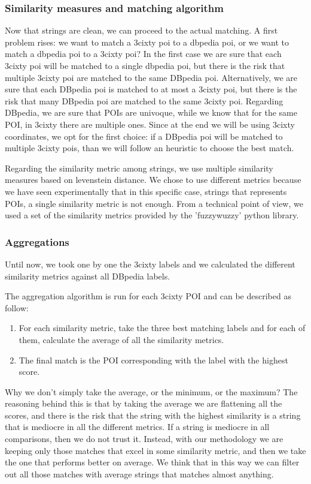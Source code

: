 \documentclass[paper=a4, fontsize=11pt]{scrartcl}
\begin{document}
\subsubsection{Similarity measures and matching algorithm}
Now that strings are clean, we can proceed to the actual matching. A first problem rises: we want to match a 3cixty poi to a dbpedia poi, or we want to match a dbpedia poi to a 3cixty poi? In the first case we are sure that each 3cixty poi will be matched to a single dbpedia poi, but there is the risk that multiple 3cixty poi are matched to the same DBpedia poi. Alternatively, we are sure that each DBpedia poi is matched to at most a 3cixty poi, but there is the risk that many DBpedia poi are matched to the same 3cixty poi.
Regarding DBpedia, we are sure that POIs are univoque, while we know that for the same POI, in 3cixty there are multiple ones.
Since at the end we will be using 3cixty coordinates, we opt for the first choice: if a DBpedia poi will be matched to multiple 3cixty pois, than we will follow an heuristic to choose the best match.

Regarding the similarity metric among strings, we use multiple similarity measures based on levenstein distance. We chose to use different metrics because we have seen experimentally that in this specific case, strings that represents POIs, a single similarity metric is not enough. From a technical point of view, we used a set of the similarity metrics provided by the 'fuzzywuzzy' python library.

\subsubsection{Aggregations}
Until now, we took one by one the 3cixty labels and we calculated the different similarity metrics against all DBpedia labels. 

The aggregation algorithm is run for each 3cixty POI and can be described as follow:
\begin{enumerate}
\item For each similarity metric, take the three best matching labels and for each of them, calculate the average of all the similarity metrics.
\item The final match is the POI corresponding with the label with the highest score.
\end{enumerate}
Why we don't simply take the average, or the minimum, or the maximum?
The reasoning behind this is that by taking the average we are flattening all the scores, and there is the risk that the string with the highest similarity is a string that is mediocre in all the different metrics. If a string is mediocre in all comparisons, then we do not trust it. Instead, with our methodology we are keeping only those matches that excel in some similarity metric, and then we take the one that performs better on average. We think that in this way we can filter out all those matches with average strings that matches almost anything.
\end{document}
